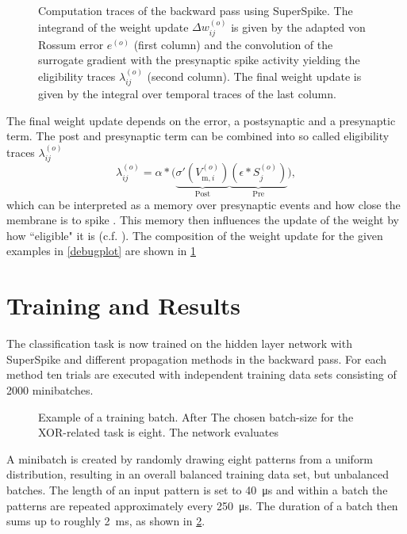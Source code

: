 \begin{figure}
	\centering
	
	\caption[Weight update in the backward pass using SuperSpike.]{Computation traces of the backward pass using SuperSpike. The integrand of the weight update $\Delta w_{ij}^{(o)}$ is given by the adapted von Rossum error $e^{(o)}$ (first column) and the convolution of the surrogate gradient with the presynaptic spike activity yielding the eligibility traces $\lambda_{ij}^{(o)}$ (second column). The final weight update is given by the integral over temporal traces of the last column.}
	\label{weightchangesplot}
\end{figure}

The final weight update depends on the error, a postsynaptic and a presynaptic term. The post and presynaptic term can be combined into so called eligibility traces $\lambda_{ij}^{(o)}$
\begin{equation*}
\lambda_{ij}^{(o)} = \alpha \ast 
\Big(\underbrace{\sigma'(V^{(o)}_{\text{m},i})}_{\text{Post}} 
\underbrace{\left(\epsilon \ast S_j^{(o)}\right)}_{\text{Pre}}\Big),
\end{equation*}
which can be interpreted as a memory over presynaptic events and how close the membrane is to spike . This memory then influences the update of the weight by how ``eligible" it is (c.f. \citealp{sutton2011reinforcement}). The composition of the weight update for the given examples in \cref{debugplot} are shown in \cref{weightchangesplot}

\section{Training and Results}

The classification task is now trained on the hidden layer network with SuperSpike and different propagation methods in the backward pass. For each method ten trials are executed with independent training data sets consisting of 2000 minibatches. 

\begin{figure}
	\centering
	
	\caption[Example of a training batch.]{Example of a training batch. After The chosen batch-size for the XOR-related task is eight. The network evaluates}
	\label{batchpatterns}
\end{figure}

A minibatch is created by randomly drawing eight patterns from a uniform distribution, resulting in an overall balanced training data set, but unbalanced batches. The length of an input pattern is set to \SI{40}{\micro \s} and within a batch the patterns are repeated approximately every \SI{250}{\micro \s}. The duration of a batch then sums up to roughly \SI{2}{\milli \s}, as shown in \cref{batchpatterns}.

